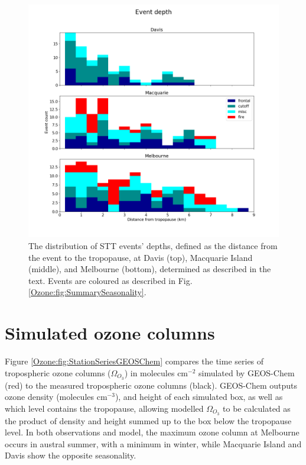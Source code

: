   \begin{figure}[t]
    \includegraphics[width=12cm]{Figures/Ozone/summary_depth.png}
    \caption{The distribution of STT events' depths, defined as the distance from the event to the tropopause, at Davis (top), Macquarie Island (middle), and Melbourne (bottom), determined as described in the text.
      Events are coloured as described in Fig. \ref{Ozone:fig:SummarySeasonality}.}
    \label{Ozone:fig:SummaryTPDepths}    
  \end{figure}
  
\section{Simulated ozone columns}
  \label{Ozone:ModelComparison}
  Figure \ref{Ozone:fig:StationSeriesGEOSChem} compares the time series of tropospheric ozone columns ($\Omega_{O_3}$) in molecules cm$^{-2}$ simulated by GEOS-Chem (red) to the measured tropospheric ozone columns (black).
  GEOS-Chem outputs ozone density (molecules cm$^{-3}$), and height of each simulated box, as well as which level contains the tropopause, allowing modelled $\Omega_{O_3}$ to be calculated as the product of density and height summed up to the box below the tropopause level.
  In both observations and model, the maximum ozone column at Melbourne occurs in austral summer, with a minimum in winter, while Macquarie Island and Davis show the opposite seasonality.
  
